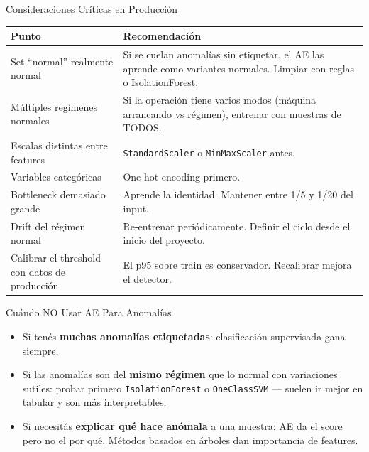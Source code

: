 \documentclass[aspectratio=169, 11pt]{beamer}
\begin{document}
\begin{frame}[shrink]{Consideraciones Críticas en Producción}
  \vspace{4pt}
  {\footnotesize
  \begin{tabular}{@{}p{4.7cm} p{8.5cm}@{}}
    \toprule
    \rowcolor{arcaLightGray}
    \textbf{Punto} & \textbf{Recomendación} \\
    \midrule
    Set ``normal'' realmente normal & Si se cuelan anomalías sin etiquetar, el AE las aprende como variantes normales. Limpiar con reglas o IsolationForest. \\
    Múltiples regímenes normales & Si la operación tiene varios modos (máquina arrancando vs régimen), entrenar con muestras de TODOS. \\
    Escalas distintas entre features & \texttt{StandardScaler} o \texttt{MinMaxScaler} antes. \\
    Variables categóricas & One-hot encoding primero. \\
    Bottleneck demasiado grande & Aprende la identidad. Mantener entre 1/5 y 1/20 del input. \\
    Drift del régimen normal & Re-entrenar periódicamente. Definir el ciclo desde el inicio del proyecto. \\
    Calibrar el threshold con datos de producción & El p95 sobre train es conservador. Recalibrar mejora el detector. \\
    \bottomrule
  \end{tabular}}
\end{frame}

\begin{frame}[shrink]{Cuándo NO Usar AE Para Anomalías}
  \vspace{10pt}
  \begin{itemize}\setlength\itemsep{8pt}
    \item Si tenés \textbf{muchas anomalías etiquetadas}: clasificación supervisada gana siempre.
    \item Si las anomalías son del \textbf{mismo régimen} que lo normal con variaciones sutiles: probar primero \texttt{IsolationForest} o \texttt{OneClassSVM} --- suelen ir mejor en tabular y son más interpretables.
    \item Si necesitás \textbf{explicar qué hace anómala} a una muestra: AE da el score pero no el por qué. Métodos basados en árboles dan importancia de features.
  \end{itemize}
\end{frame}
\end{document}
